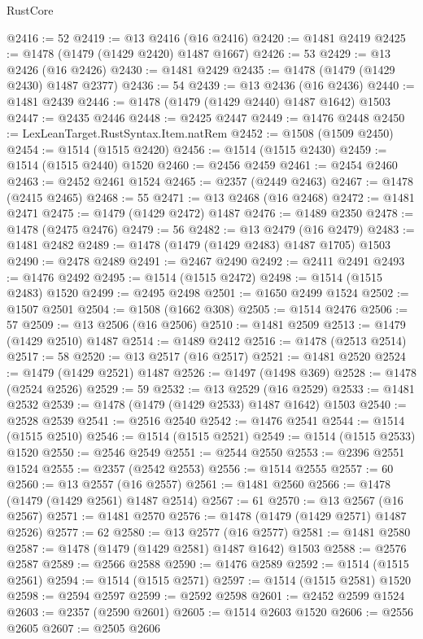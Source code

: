 \begin{lexlean}{RustCore}
\begin{coremodule}
@2416 := 52
@2419 := @13 @2416 (@16 @2416)
@2420 := @1481 @2419
@2425 := @1478 (@1479 (@1429 @2420) @1487 @1667)
@2426 := 53
@2429 := @13 @2426 (@16 @2426)
@2430 := @1481 @2429
@2435 := @1478 (@1479 (@1429 @2430) @1487 @2377)
@2436 := 54
@2439 := @13 @2436 (@16 @2436)
@2440 := @1481 @2439
@2446 := @1478 (@1479 (@1429 @2440) @1487 @1642) @1503
@2447 := @2435 @2446
@2448 := @2425 @2447
@2449 := @1476 @2448
@2450 := LexLeanTarget.RustSyntax.Item.natRem
@2452 := @1508 (@1509 @2450)
@2454 := @1514 (@1515 @2420)
@2456 := @1514 (@1515 @2430)
@2459 := @1514 (@1515 @2440) @1520
@2460 := @2456 @2459
@2461 := @2454 @2460
@2463 := @2452 @2461 @1524
@2465 := @2357 (@2449 @2463)
@2467 := @1478 (@2415 @2465)
@2468 := 55
@2471 := @13 @2468 (@16 @2468)
@2472 := @1481 @2471
@2475 := @1479 (@1429 @2472) @1487
@2476 := @1489 @2350
@2478 := @1478 (@2475 @2476)
@2479 := 56
@2482 := @13 @2479 (@16 @2479)
@2483 := @1481 @2482
@2489 := @1478 (@1479 (@1429 @2483) @1487 @1705) @1503
@2490 := @2478 @2489
@2491 := @2467 @2490
@2492 := @2411 @2491
@2493 := @1476 @2492
@2495 := @1514 (@1515 @2472)
@2498 := @1514 (@1515 @2483) @1520
@2499 := @2495 @2498
@2501 := @1650 @2499 @1524
@2502 := @1507 @2501
@2504 := @1508 (@1662 @308)
@2505 := @1514 @2476
@2506 := 57
@2509 := @13 @2506 (@16 @2506)
@2510 := @1481 @2509
@2513 := @1479 (@1429 @2510) @1487
@2514 := @1489 @2412
@2516 := @1478 (@2513 @2514)
@2517 := 58
@2520 := @13 @2517 (@16 @2517)
@2521 := @1481 @2520
@2524 := @1479 (@1429 @2521) @1487
@2526 := @1497 (@1498 @369)
@2528 := @1478 (@2524 @2526)
@2529 := 59
@2532 := @13 @2529 (@16 @2529)
@2533 := @1481 @2532
@2539 := @1478 (@1479 (@1429 @2533) @1487 @1642) @1503
@2540 := @2528 @2539
@2541 := @2516 @2540
@2542 := @1476 @2541
@2544 := @1514 (@1515 @2510)
@2546 := @1514 (@1515 @2521)
@2549 := @1514 (@1515 @2533) @1520
@2550 := @2546 @2549
@2551 := @2544 @2550
@2553 := @2396 @2551 @1524
@2555 := @2357 (@2542 @2553)
@2556 := @1514 @2555
@2557 := 60
@2560 := @13 @2557 (@16 @2557)
@2561 := @1481 @2560
@2566 := @1478 (@1479 (@1429 @2561) @1487 @2514)
@2567 := 61
@2570 := @13 @2567 (@16 @2567)
@2571 := @1481 @2570
@2576 := @1478 (@1479 (@1429 @2571) @1487 @2526)
@2577 := 62
@2580 := @13 @2577 (@16 @2577)
@2581 := @1481 @2580
@2587 := @1478 (@1479 (@1429 @2581) @1487 @1642) @1503
@2588 := @2576 @2587
@2589 := @2566 @2588
@2590 := @1476 @2589
@2592 := @1514 (@1515 @2561)
@2594 := @1514 (@1515 @2571)
@2597 := @1514 (@1515 @2581) @1520
@2598 := @2594 @2597
@2599 := @2592 @2598
@2601 := @2452 @2599 @1524
@2603 := @2357 (@2590 @2601)
@2605 := @1514 @2603 @1520
@2606 := @2556 @2605
@2607 := @2505 @2606

\end{coremodule}
\end{lexlean}
